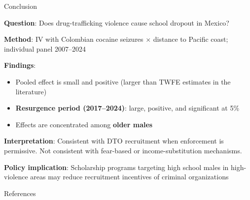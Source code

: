 \documentclass[aspectratio=169]{beamer}
\begin{document}
\begin{frame}{Conclusion}

\textbf{Question}: Does drug-trafficking violence cause school dropout in Mexico?

\vspace{0.5cm}

\textbf{Method}: IV with Colombian cocaine seizures $\times$ distance to Pacific coast; individual panel 2007--2024

\vspace{0.5cm}
\pause

\textbf{Findings}:
\begin{itemize}
    \item Pooled effect is small and positive (larger than TWFE estimates in the literature)
    \item \textbf{Resurgence period (2017--2024)}: large, positive, and significant at 5\%
    \item Effects are concentrated among \textbf{older males}
\end{itemize}

\vspace{0.3cm}
\pause

\textbf{Interpretation}: Consistent with DTO recruitment when enforcement is permissive. Not consistent with fear-based or income-substitution mechanisms.

\vspace{0.3cm}
\pause

\textbf{Policy implication}: Scholarship programs targeting high school males in high-violence areas may reduce recruitment incentives of criminal organizations

\end{frame}


\begin{frame}[allowframebreaks]{References}

\end{frame}
\end{document}
